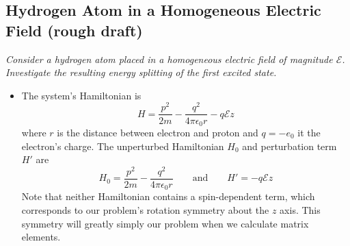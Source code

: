 \documentclass[11pt, a4paper]{article}
\newcommand{\eqtext}[1]{\qquad \text{#1} \qquad}
\newcommand{\Ham}{Hamiltonian\xspace}
\newcommand{\E}{\mathcal{E}}  %
\begin{document}
\subsection{Hydrogen Atom in a Homogeneous Electric Field (rough draft)}
\textit{Consider a hydrogen atom placed in a homogeneous electric field of magnitude $ \E $. Investigate the resulting energy splitting of the first excited state.}
\begin{itemize}
	\item The system's \Ham is 
	\begin{equation*}
		H = \frac{p^{2}}{2m} - \frac{q^{2}}{4\pi \epsilon_{0} r} - q \E z
	\end{equation*}
	where $ r $ is the distance between electron and proton and $ q = -e_{0} $ it the electron's charge. The unperturbed Hamiltonian $ H_{0} $ and perturbation term $ H' $ are
	\begin{equation*}
		H_{0} = \frac{p^{2}}{2m} - \frac{q^{2}}{4\pi \epsilon_{0} r} \eqtext{and} H' = - q \E z
	\end{equation*}
	Note that neither \Ham contains a spin-dependent term, which corresponds to our problem's rotation symmetry about the $ z $ axis. This symmetry will greatly simply our problem when we calculate matrix elements. 
\end{itemize}
\end{document}
